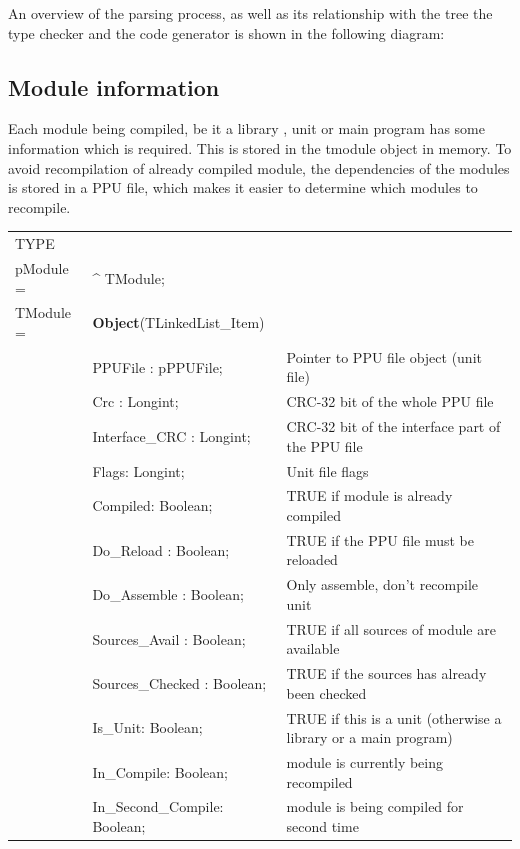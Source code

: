 \documentclass [a4paper,12pt]{article}
\begin{document}
An overview of the parsing process, as well as its relationship with the
tree the type checker and the code generator is shown in the following
diagram:

\subsection{Module information}
\label{subsec:module}

Each module being compiled, be it a library , unit or main program has some
information which is required. This is stored in the tmodule object in
memory. To avoid recompilation of already compiled module, the dependencies
of the modules is stored in a PPU file, which makes it easier to determine
which modules to recompile.

\begin{longtable}{|l@{\extracolsep{\fill}}lp{7cm}|}
\hline
\endhead
\hline
\endfoot
\textsf{TYPE}& & \\
\xspace pModule = & \^{}  TModule; & \\
\xspace \textsf{TModule} = & \textbf{Object}(TLinkedList\_Item) & \\
&\textsf{PPUFile : pPPUFile;}& Pointer to PPU file object (unit file) \\
&\textsf{Crc : Longint;}& CRC-32 bit of the whole PPU file \\
&\textsf{Interface{\_}CRC : Longint;}& CRC-32 bit of the interface part of the PPU file \\
&\textsf{Flags: Longint;}& Unit file flags \\
&\textsf{Compiled: Boolean;}& TRUE if module is already compiled \\
&\textsf{Do{\_}Reload : Boolean;}   & TRUE if the PPU file must be reloaded \\
&\textsf{Do{\_}Assemble : Boolean;} & Only assemble, don't recompile unit \\
&\textsf{Sources{\_}Avail : Boolean;}   & TRUE if all sources of module are available \\
&\textsf{Sources{\_}Checked : Boolean;} & TRUE if the sources has already been checked \\
&\textsf{Is{\_}Unit: Boolean;}      & TRUE if this is a unit (otherwise a library or a main program) \\
&\textsf{In{\_}Compile: Boolean;}   & module is currently being recompiled \\
&\textsf{In{\_}Second{\_}Compile: Boolean;}& module is being compiled for second time \\

\end{longtable}
\end{document}
